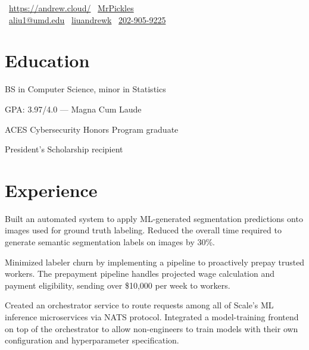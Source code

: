 \documentclass[]{template}
\begin{document}
{
  \faHome \, \url{https://andrew.cloud/}
  \textcolor{white}{\textbullet} %
  \faGithub \, \href{https://github.com/MrPickles}{MrPickles}
  \\ %
  \textcolor{white}{\textbullet} %
  \faEnvelope \, \href{mailto:aliu1@umd.edu}{aliu1@umd.edu}
  \textcolor{white}{\textbullet} %
  \faLinkedin \, \href{https://linkedin.com/in/liuandrewk}{liuandrewk}
  \textcolor{white}{\textbullet} %
  \faPhone \, \href{tel:2029059225}{202-905-9225}
}

\section{Education}

\hfill
{}
\begin{tightemize}
\item BS in Computer Science, minor in Statistics
\item GPA: 3.97/4.0 --- Magna Cum Laude
\item ACES Cybersecurity Honors Program graduate
\item President's Scholarship recipient
\end{tightemize}

\section{Experience}

\hfill
{}
\begin{tightemize}
\item
  Built an automated system to apply ML-generated segmentation predictions onto
  images used for ground truth labeling.
  Reduced the overall time required to generate semantic segmentation labels on
  images by 30\%.
\item
  Minimized labeler churn by implementing a pipeline to proactively prepay
  trusted workers.
  The prepayment pipeline handles projected wage calculation and payment
  eligibility, sending over \$10,000 per week to workers.
\item
  Created an orchestrator service to route requests among all of Scale's ML
  inference microservices via NATS protocol.
  Integrated a model-training frontend on top of the orchestrator to allow
  non-engineers to train models with their own configuration and hyperparameter
  specification.
\item
\end{tightemize}
\end{document}
